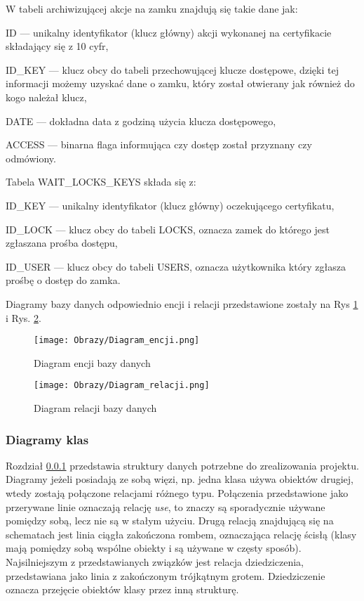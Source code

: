 	W tabeli archiwizującej akcje na zamku znajdują się takie dane jak:
	\begin{itemize*}
		\item {ID} --- unikalny identyfikator (klucz główny) akcji wykonanej na certyfikacie składający się z 10 cyfr,
		\item {ID\_KEY} --- klucz obcy do tabeli przechowującej klucze dostępowe, dzięki tej informacji możemy uzyskać dane o zamku, który został otwierany jak również do kogo należał klucz,
		\item {DATE} --- dokładna data z godziną użycia klucza dostępowego,
		\item {ACCESS} --- binarna flaga informująca czy dostęp został przyznany czy odmówiony.
	\end{itemize*}

	Tabela WAIT\_LOCKS\_KEYS składa się z:
	\begin{itemize*}
		\item {ID\_KEY} --- unikalny identyfikator (klucz główny) oczekującego certyfikatu,
		\item{ID\_LOCK} --- klucz obcy do tabeli LOCKS, oznacza zamek do którego jest zgłaszana prośba dostępu,
		\item {ID\_USER} --- klucz obcy do tabeli USERS, oznacza użytkownika który zgłasza prośbę o dostęp do zamka.
	\end{itemize*}
	
	Diagramy bazy danych odpowiednio encji i relacji przedstawione zostały na Rys \ref{diagram:diagram encji} i Rys. \ref{diagram:diagram relacji}.\cite{BD}  
	
	\begin{figure}[!h]
		\centering
		\texttt{[image: Obrazy/Diagram\_encji.png]}
		\caption{Diagram encji bazy danych}
		\label{diagram:diagram encji}
	\end{figure}
	\newpage
	\begin{figure}[!h]
		\centering
		\texttt{[image: Obrazy/Diagram\_relacji.png]}
		\caption{Diagram relacji bazy danych}
		\label{diagram:diagram relacji}
	\end{figure}
\newpage

	\subsubsection{Diagramy klas}\label{sec:diagramy klas}
	Rozdział \ref{sec:diagramy klas} przedstawia struktury danych potrzebne do zrealizowania projektu. Diagramy jeżeli posiadają ze sobą więzi, np. jedna klasa używa obiektów drugiej, wtedy zostają połączone relacjami różnego typu. Połączenia przedstawione jako przerywane linie oznaczają relację \textit{use}, to znaczy są sporadycznie używane pomiędzy sobą, lecz nie są w stałym użyciu. Drugą relacją znajdującą się na schematach jest linia ciągła zakończona rombem, oznaczająca relację ścisłą (klasy mają pomiędzy sobą wspólne obiekty i są używane w częsty sposób). Najsilniejszym z przedstawianych związków jest relacja dziedziczenia, przedstawiana jako linia z zakończonym trójkątnym grotem. Dziedziczenie oznacza przejęcie obiektów klasy przez inną strukturę.
